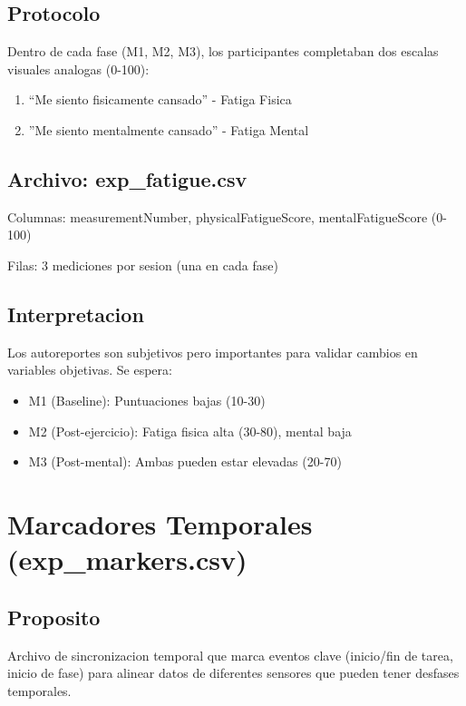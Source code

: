 \subsection{Protocolo}

Dentro de cada fase (M1, M2, M3), los participantes completaban dos escalas visuales
analogas (0-100):

\begin{enumerate}
    \item ``Me siento fisicamente cansado'' - Fatiga Fisica
    \item ''Me siento mentalmente cansado'' - Fatiga Mental
\end{enumerate}

\subsection{Archivo: exp\_fatigue.csv}

Columnas: measurementNumber, physicalFatigueScore, mentalFatigueScore (0-100)

Filas: 3 mediciones por sesion (una en cada fase)

\subsection{Interpretacion}

Los autoreportes son subjetivos pero importantes para validar cambios en variables
objetivas. Se espera:

\begin{itemize}
    \item M1 (Baseline): Puntuaciones bajas (10-30)
    \item M2 (Post-ejercicio): Fatiga fisica alta (30-80), mental baja
    \item M3 (Post-mental): Ambas pueden estar elevadas (20-70)
\end{itemize}

\section{Marcadores Temporales (exp\_markers.csv)}

\subsection{Proposito}

Archivo de sincronizacion temporal que marca eventos clave (inicio/fin de tarea,
inicio de fase) para alinear datos de diferentes sensores que pueden tener
desfases temporales.

